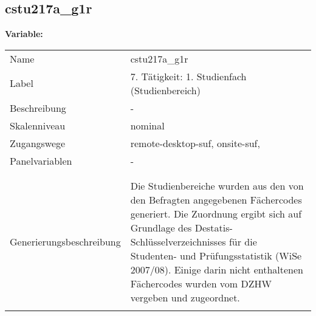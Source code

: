 	
	
	\subsection{cstu217a\_g1r}
	\label{subSection:cstu217a_g1r}

	\noindent\textbf{Variable:}\\
		\begin{tabular}{lL{11.3cm}}
			\label{tableVariable:cstu217a_g1r}
			Name & cstu217a\_g1r \\
			Label & 7. Tätigkeit: 1. Studienfach (Studienbereich) \\
			Beschreibung & - \\
			Skalenniveau & nominal \\
			Zugangswege &
				remote-desktop-suf,
				onsite-suf,
 \\
			Panelvariablen & -
			 \\
			 \\
 \\
					Generierungsbeschreibung & Die Studienbereiche wurden aus den von den Befragten angegebenen Fächercodes generiert. Die Zuordnung ergibt sich auf Grundlage des Destatis-Schlüsselverzeichnisses für die Studenten- und Prüfungsstatistik (WiSe 2007/08). Einige darin nicht enthaltenen Fächercodes wurden vom DZHW vergeben und zugeordnet. 
				 \\	
			 \\
		\end{tabular}






